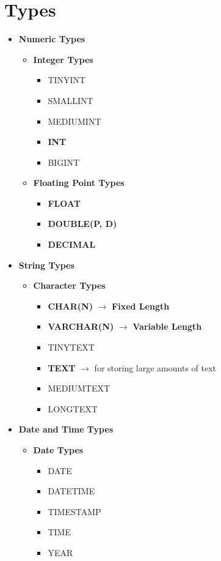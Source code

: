 \documentclass[twoside]{article}
\begin{document}
\section*{Types}
\begin{itemize}
    \item \textbf{Numeric Types}
    \begin{itemize}
        \item \textbf{Integer Types}
        \begin{itemize}
            \item TINYINT
            \item SMALLINT
            \item MEDIUMINT
            \item \textbf{INT}
            \item BIGINT
        \end{itemize}
        \item \textbf{Floating Point Types}
        \begin{itemize}
            \item \textbf{FLOAT}
            \item \textbf{DOUBLE(P, D)}
            \item \textbf{DECIMAL}
        \end{itemize}
    \end{itemize}
    \item \textbf{String Types}
    \begin{itemize}
        \item \textbf{Character Types}
        \begin{itemize}
            \item \textbf{CHAR(N)} $\longrightarrow$ \textbf{Fixed Length}
            \item \textbf{VARCHAR(N)} $\longrightarrow$ \textbf{Variable Length}
            \item TINYTEXT
            \item \textbf{TEXT} $\longrightarrow$ for storing large amounts of 
            text
            \item MEDIUMTEXT
            \item LONGTEXT
        \end{itemize}
    \end{itemize}
    \item \textbf{Date and Time Types}
    \begin{itemize}
        \item \textbf{Date Types}
        \begin{itemize}
            \item DATE
            \item DATETIME
            \item TIMESTAMP
            \item TIME
            \item YEAR
        \end{itemize}
    \end{itemize}
\end{itemize}
\end{document}
